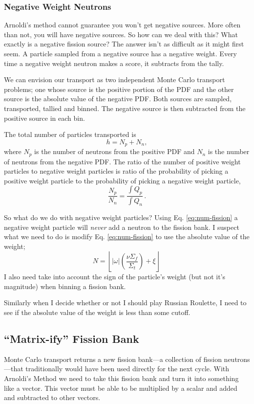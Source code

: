 \documentclass[12pt]{article}
\begin{document}
\subsubsection{Negative Weight Neutrons}
Arnoldi's method cannot guarantee you won't get negative sources.  More often than not, you will have negative sources.  So how can we deal with this?  What exactly is a negative fission source?  The answer isn't as difficult as it might first seem.  A particle sampled from a negative source has a negative weight.  Every time a negative weight neutron makes a score, it subtracts from the tally.  

We can envision our transport as two independent Monte Carlo transport problems; one whose source is the positive portion of the PDF and the other source is the absolute value of the negative PDF.  Both sources are sampled, transported, tallied and binned.  The negative source is then subtracted from the positive source in each bin.  

The total number of particles transported is
\begin{equation}
    h = N_p + N_n,
\end{equation}
where $N_p$ is the number of neutrons from the positive PDF and $N_n$ is the number of neutrons from the negative PDF.  The ratio of the number of positive weight particles to negative weight particles is ratio of the probability of picking a positive weight particle to the probability of picking a negative weight particle,
\begin{equation}\label{eq:PDFprob}
    \frac{N_p}{N_n} = \frac{\int{Q_p}}{\int{Q_n}}\,.
\end{equation}

So what do we do with negative weight particles?  Using Eq. \ref{eq:num-fission} a negative weight particle will \emph{never} add a neutron to the fission bank.  I suspect what we need to do is modify Eq. \ref{eq:num-fission} to use the absolute value of the weight; 
\begin{equation}
    N = \left\lfloor|\omega|\left(\frac{\nu\Sigma_f}{\Sigma_t}\right) + \xi\right\rfloor\,
\end{equation}
I also need take into account the sign of the particle's weight (but not it's magnitude) when binning a fission bank.  

Similarly when I decide whether or not I should play Russian Roulette, I need to see if the absolute value of the weight is less than some cutoff.
\normalcolor

\subsection{``Matrix-ify'' Fission Bank}
Monte Carlo transport returns a new fission bank---a collection of fission neutrons---that traditionally would have been used directly for the next cycle.  With Arnoldi's Method we need to take this fission bank and turn it into something like a vector.  This vector must be able to be multiplied by a scalar and added and subtracted to other vectors.
\end{document}
